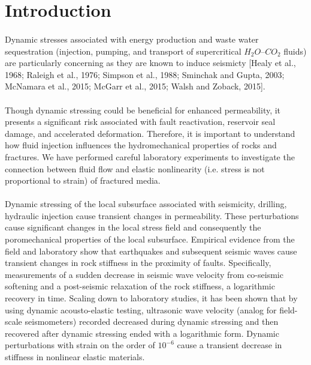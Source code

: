 
\section{Introduction}

\paragraph{} Dynamic stresses associated with energy production and waste water sequestration (injection, pumping, and transport of supercritical $H_{2}O$--$CO_{2}$ fluids) are particularly concerning as they are known to induce seismicty [Healy et al., 1968; Raleigh et al., 1976; Simpson et al., 1988; Sminchak and Gupta, 2003; McNamara et al., 2015; McGarr et al., 2015; Walsh and Zoback, 2015]. \cite{rtmQ,migExt}

\paragraph{} Though dynamic stressing could be beneficial for enhanced permeability, it presents a significant risk associated with fault reactivation, reservoir seal damage, and accelerated deformation. Therefore, it is important to understand how fluid injection influences the hydromechanical properties of rocks and fractures. We have performed careful laboratory experiments to investigate the connection between fluid flow and elastic nonlinearity (i.e. stress is not proportional to strain) of fractured media.

\paragraph{} Dynamic stressing of the local subsurface associated with seismicity, drilling, hydraulic injection cause transient changes in permeability. These perturbations cause significant changes in the local stress field and consequently the poromechanical properties of the local subsurface. Empirical evidence from the field and laboratory show that earthquakes and subsequent seismic waves cause transient changes in rock stiffness in the proximity of faults. Specifically, measurements of a sudden decrease in seismic wave velocity from co-seismic softening and a post-seismic relaxation of the rock stiffness, a logarithmic recovery in time. Scaling down to laboratory studies, it has been shown that by using dynamic acousto-elastic testing, ultrasonic wave velocity (analog for field-scale seismometers) recorded decreased during dynamic stressing and then recovered after dynamic stressing ended with a logarithmic form. Dynamic perturbations with strain on the order of $10^{-6}$ cause a transient decrease in stiffness in nonlinear elastic materials. 

